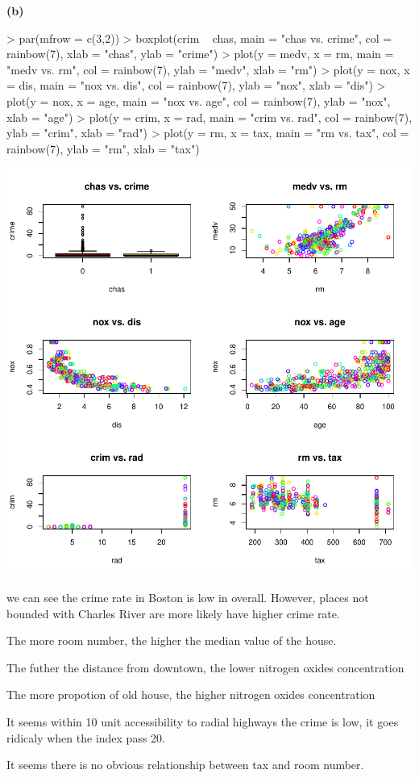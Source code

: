 \documentclass[a4paper]{article}
\renewcommand{\part}[1] {\vspace{.10in} {\bf (#1)}}
\begin{document}
\part{b}
\begin{Schunk}
\begin{Sinput}
> par(mfrow = c(3,2))
> boxplot(crim ~ chas, main = "chas vs. crime", col = rainbow(7), xlab = "chas", ylab = "crime")
> plot(y = medv, x = rm, main = "medv vs. rm", col = rainbow(7), ylab = "medv", xlab = "rm")
> plot(y = nox, x = dis, main = "nox vs. dis", col = rainbow(7), ylab = "nox", xlab = "dis")
> plot(y = nox, x = age, main = "nox vs. age", col = rainbow(7), ylab = "nox", xlab = "age")
> plot(y = crim, x = rad, main = "crim vs. rad", col = rainbow(7), ylab = "crim", xlab = "rad")
> plot(y = rm, x = tax, main = "rm vs. tax", col = rainbow(7), ylab = "rm", xlab = "tax")
\end{Sinput}
\end{Schunk}
\includegraphics{lm-pairboston}
\begin{enumerate}
{
\color{red}
\item we can see the crime rate in Boston is low in overall. However, places not bounded with Charles River are more likely have higher crime rate.
\item The more room number, the higher the median value of the house.
\item The futher the distance from downtown, the lower nitrogen oxides concentration
\item The more propotion of old house, the higher nitrogen oxides concentration
\item It seems within 10 unit accessibility to radial highways the crime is low, it goes ridicaly when the index pass 20.
\item It seems there is no obvious relationship between tax and room number.
}
\end{enumerate}
\end{document}
